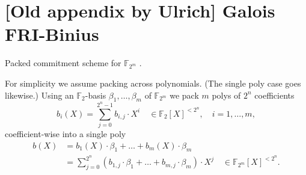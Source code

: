 \section{[Old appendix by Ulrich] Galois FRI-Binius}

 

Packed commitment scheme for $\mathbb F_{2^m}$ . %

For simplicity we assume packing across polynomials. 
(The single poly case goes likewise.)
Using an $\mathbb F_2$-basis $\beta_1,\ldots, \beta_{m}$ of $\mathbb F_{2^m}$ we
pack $m$ polys of $2^n$ coefficients %
\[
b_i(X) = \sum_{j=0}^{2^n - 1} b_{i,j} \cdot X^i \quad \in \mathbb F_2[X]^{< 2^n}, 
\quad i = 1, \ldots, m,
\]
coefficient-wise into a single poly 
\begin{align*}
b(X) &= b_1(X)\cdot \beta_1 + \ldots + b_{m}(X) \cdot\beta_m
\\
&= \sum_{j=0}^{2^n} (b_{1,j}\cdot \beta_1 + \ldots + b_{m,j}\cdot \beta_{m}) \cdot X^j 
\quad \in \mathbb F_{2^m}[X]^{<2^n}.
\end{align*}


